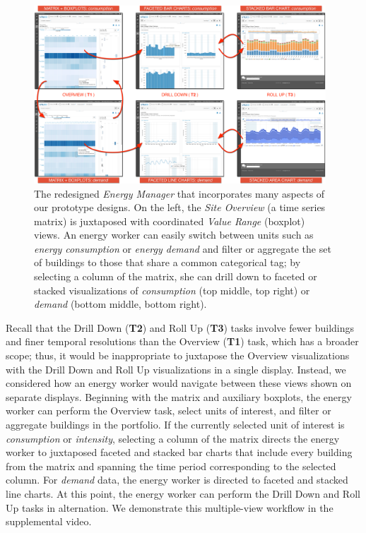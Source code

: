 \documentclass[journal]{vgtc}                %
\newcommand{\bstart}[1]{\vspace{1mm} \noindent{\textbf{#1:}}}
\begin{document}
\begin{figure}[hbp!]
    \vspace{-0.3cm}
	\centering
	\includegraphics[width=0.975\textwidth]{figures/emu.pdf}
	\vspace{-0.3cm}
	\caption{The redesigned \textsl{Energy Manager} that incorporates many aspects of our prototype designs. On the left, the \textsl{Site Overview} (a time series matrix) is juxtaposed with coordinated \textsl{Value Range} (boxplot) views. An energy worker can easily switch between units such as \textsl{energy consumption} or \textsl{energy demand} and filter or aggregate the set of buildings to those that share a common categorical tag; by selecting a column of the matrix, she can drill down to faceted or stacked visualizations of \textsl{consumption} (top middle, top right) or \textsl{demand} (bottom middle, bottom right).}
	\label{fig:emu}
\end{figure} 

\bstart{Sequenced view navigation}
Recall that the Drill Down ({\bf T2}) and Roll Up ({\bf T3}) tasks involve fewer buildings and finer temporal resolutions than the Overview ({\bf T1}) task, which has a broader scope; 
thus, it would be inappropriate to juxtapose the Overview visualizations with the Drill Down and Roll Up visualizations in a single display.
Instead, we considered how an energy worker would navigate between these views shown on separate displays.
Beginning with the matrix and auxiliary boxplots, the energy worker can perform the Overview task, select units of interest, and filter or aggregate buildings in the portfolio. 
If the currently selected unit of interest is {\it consumption} or {\it intensity}, selecting a column of the matrix directs the energy worker to juxtaposed faceted and stacked bar charts that include every building from the matrix and spanning the time period corresponding to the selected column. 
For {\it demand} data, the energy worker is directed to faceted and stacked line charts.
At this point, the energy worker can perform the Drill Down and Roll Up tasks in alternation.
We demonstrate this multiple-view workflow in the supplemental video.
\end{document}

